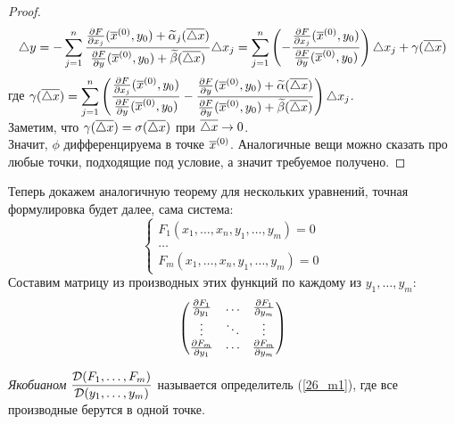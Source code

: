 \begin{proof}
	\[
	\tr y=-\sum_{j=1}^n\frac
	{
	\frac{\vd F}{\vd x_j}(\vx\n,y_0)+\t\al_j(\v{\tr x})
	}{
	\frac{\vd F}{\vd y}(\vx\n,y_0)+\t\beta(\v{\tr x})
	}
	\tr x_j
	=\sum_{j=1}^n\l(-\frac
	{
	\frac{\vd F}{\vd x_j}(\vx\n,y_0)
	}{
	\frac{\vd F}{\vd y}(\vx\n,y_0)
	}\r)\tr x_j+\gamma(\v{\tr x})
	\]
	где $\ds\gamma(\v{\tr x})=\sum_{j=1}^n\l(
	\frac
	{
	\frac{\vd F}{\vd x_j}(\vx\n, y_0)
	}{
	\frac{\vd F}{\vd y}(\vx\n,y_0)
	}-\frac{
	\frac{\vd F}{\vd y}(\vx\n,y_0)+\t\al(\v{\tr x})
	}{
	\frac{\vd F}{\vd y}(\vx\n,y_0)+\t\beta(\v{\tr x})
	}\r)\tr x_j$.\\
	Заметим, что $\gamma(\overline{\triangle x})=\sigma(\overline{\triangle x})$ при $\overline{\triangle x}\rightarrow0$.\\
	Значит, $\phi$ дифференцируема в точке $\overline x^{({0})}$. Аналогичные вещи можно сказать про любые точки, подходящие под условие, а значит требуемое получено.
\end{proof}
\begin{note}
	Теперь докажем аналогичную теорему для нескольких уравнений, точная формулировка будет далее, сама система:
	\begin{equation}\label{26_eq1}
		\begin{cases}
			F_1(x_1,\dots,x_n,y_1,\dots,y_m)=0\\
			\dots\\
			F_m(x_1,\dots,x_n,y_1,\dots,y_m)=0
		\end{cases}
	\end{equation}
	Составим матрицу из производных этих функций по каждому из $y_1,\dots,y_m$:
	\begin{equation}\label{26_m1}
		\begin{pmatrix}
			\frac{\partial F_1}{\partial y_1} & \dots & \frac{\partial F_1}{\partial y_m} \\
			\vdots & \ddots & \vdots \\
			\frac{\partial F_m}{\partial y_1} & \cdots & \frac{\partial F_m}{\partial y_m}
		\end{pmatrix}
	\end{equation}
\end{note}
\begin{definition}
	\textit{Якобианом} $\displaystyle\frac{\mathcal D(F_1,\dots,F_m)}{\mathcal D(y_1,\dots,y_m)}$ называется определитель (\ref{26_m1}), где все производные берутся в одной точке.
\end{definition}
